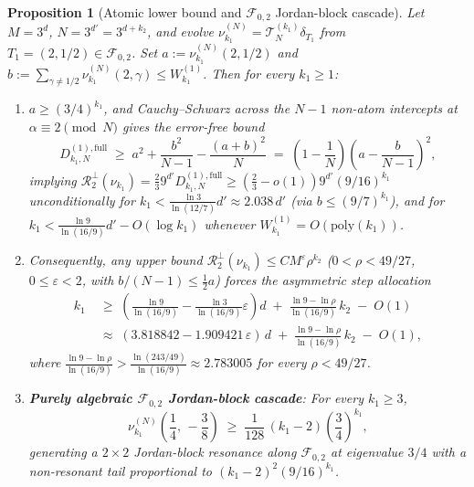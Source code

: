 \documentclass[11pt,a4paper]{article}
\numberwithin{equation}{section}
\newtheorem{proposition}[theorem]{Proposition}
\theoremstyle{definition}
\theoremstyle{remark}
\newcommand{\cF}{\mathcal{F}}
\newcommand{\cT}{\mathcal{T}}
\begin{document}
\begin{proposition}[Atomic lower bound and $\cF_{0,2}$ Jordan-block cascade]\label{prop:atomic_jordan}
Let $M = 3^d$, $N = 3^{d'} = 3^{d + k_2}$, and evolve $\nu_{k_1}^{(N)} = \cT_N^{(k_1)}\delta_{T_1}$ from $T_1 = (2, 1/2) \in \cF_{0, 2}$. Set $a := \nu_{k_1}^{(N)}(2, 1/2)$ and $b := \sum_{\gamma \neq 1/2} \nu_{k_1}^{(N)}(2, \gamma) \le W_{k_1}^{(1)}$. Then for every $k_1 \ge 1$:
\begin{enumerate}[label=(\arabic*)]
\item $a \ge (3/4)^{k_1}$, and Cauchy--Schwarz across the $N - 1$ non-atom intercepts at $\alpha \equiv 2 \pmod N$ gives the error-free bound
\[
D_{k_1, N}^{(1), \mathrm{full}} \;\ge\; a^2 + \frac{b^2}{N - 1} - \frac{(a + b)^2}{N} \;=\; \left(1 - \frac{1}{N}\right)\left(a - \frac{b}{N - 1}\right)^2,
\]
implying $\mathcal{R}_2^{\perp}(\nu_{k_1}) = \frac{2}{3}9^{d'} D_{k_1, N}^{(1), \mathrm{full}} \ge (\frac{2}{3} - o(1))9^{d'}(9/16)^{k_1}$ unconditionally for $k_1 < \frac{\ln 3}{\ln(12/7)}d' \approx 2.038\,d'$ (via $b \le (9/7)^{k_1}$), and for $k_1 < \frac{\ln 9}{\ln(16/9)}d' - O(\log k_1)$ whenever $W_{k_1}^{(1)} = O(\mathrm{poly}(k_1))$.
\item Consequently, any upper bound $\mathcal{R}_2^{\perp}(\nu_{k_1}) \le C M^\varepsilon \rho^{k_2}$ ($0 < \rho < 49/27$, $0 \le \varepsilon < 2$, with $b/(N-1) \le \frac{1}{2}a$) forces the asymmetric step allocation
\[
\begin{aligned}
k_1&\;\ge\; \left(\frac{\ln 9}{\ln(16/9)} - \frac{\ln 3}{\ln(16/9)}\varepsilon\right) d \;+\; \frac{\ln 9 - \ln\rho}{\ln(16/9)}\, k_2 \;-\; O(1)\\
&\;\approx\; (3.818842 - 1.909421\,\varepsilon)\, d \;+\; \frac{\ln 9 - \ln\rho}{\ln(16/9)}\, k_2 \;-\; O(1),
\end{aligned}
\]
where $\frac{\ln 9 - \ln\rho}{\ln(16/9)} > \frac{\ln(243/49)}{\ln(16/9)} \approx 2.783005$ for every $\rho < 49/27$.
\item \textbf{Purely algebraic $\cF_{0,2}$ Jordan-block cascade}: For every $k_1 \ge 3$,
\[
\nu_{k_1}^{(N)}\!\left(\frac{1}{4},\, -\frac{3}{8}\right) \;\ge\; \frac{1}{128}\,(k_1 - 2)\left(\frac{3}{4}\right)^{k_1},
\]
generating a $2\times 2$ Jordan-block resonance along $\cF_{0,2}$ at eigenvalue $3/4$ with a non-resonant tail proportional to $(k_1 - 2)^2(9/16)^{k_1}$.
\end{enumerate}
\end{proposition}
\end{document}
